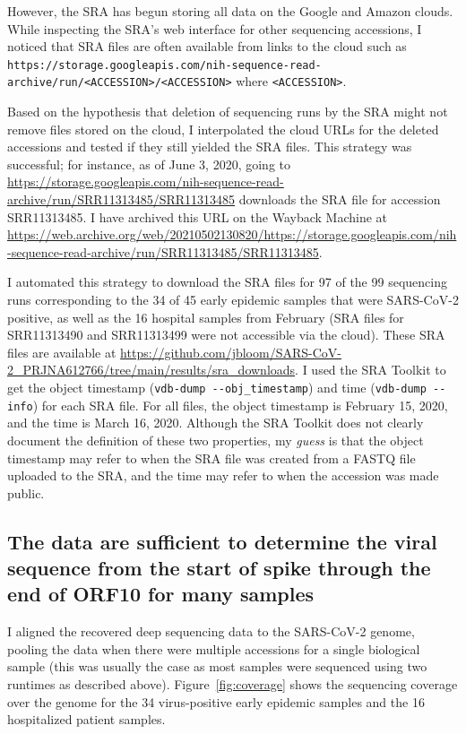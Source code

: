 \documentclass[9pt,twocolumn,twoside]{gsajnl_modified}
\begin{document}
However, the SRA has begun storing all data on the Google and Amazon clouds.
While inspecting the SRA's web interface for other sequencing accessions, I noticed that SRA files are often available from links to the cloud such as \texttt{https://storage.googleapis.com/nih-sequence-read-archive/run/<ACCESSION>/<ACCESSION>} where \texttt{<ACCESSION>}.

Based on the hypothesis that deletion of sequencing runs by the SRA might not remove files stored on the cloud, I interpolated the cloud URLs for the deleted accessions and tested if they still yielded the SRA files.
This strategy was successful; for instance, as of June 3, 2020, going to \url{https://storage.googleapis.com/nih-sequence-read-archive/run/SRR11313485/SRR11313485} downloads the SRA file for accession SRR11313485.
I have archived this URL on the Wayback Machine at \url{https://web.archive.org/web/20210502130820/https://storage.googleapis.com/nih-sequence-read-archive/run/SRR11313485/SRR11313485}.

I automated this strategy to download the SRA files for 97 of the 99 sequencing runs corresponding to the 34 of 45 early epidemic samples that were SARS-CoV-2 positive, as well as the 16 hospital samples from February (SRA files for SRR11313490 and SRR11313499 were not accessible via the cloud).
These SRA files are available at \url{https://github.com/jbloom/SARS-CoV-2_PRJNA612766/tree/main/results/sra_downloads}.
I used the SRA Toolkit to get the object timestamp (\texttt{vdb-dump -{}-obj\_timestamp}) and time (\texttt{vdb-dump -{}-info}) for each SRA file.
For all files, the object timestamp is February 15, 2020, and the time is March 16, 2020.
Although the SRA Toolkit does not clearly document the definition of these two properties, my \emph{guess} is that the object timestamp may refer to when the SRA file was created from a FASTQ file uploaded to the SRA, and the time may refer to when the accession was made public.

\subsection{The data are sufficient to determine the viral sequence from the start of spike through the end of ORF10 for many samples}
I aligned the recovered deep sequencing data to the SARS-CoV-2 genome, pooling the data when there were multiple accessions for a single biological sample (this was usually the case as most samples were sequenced using two runtimes as described above).
Figure~\ref{fig:coverage} shows the sequencing coverage over the genome for the 34 virus-positive early epidemic samples and the 16 hospitalized patient samples.
\end{document}
